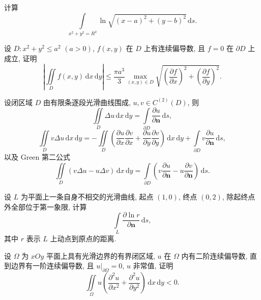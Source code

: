 \documentclass[../数学分析培优讲义.tex]{subfiles}
\begin{document}
\begin{example}
计算
\[
    \int\limits_{x^2+y^2=R^2}\ln\sqrt{(x-a)^2+(y-b)^2}\,\mathrm{d}s.
\]
\end{example}
\exampleblank

\begin{example}
设 $D:x^2+y^2\leq a^2$ $(a>0)$, $f(x,y)$ 在 $D$ 上有连续偏导数, 且 $f=0$ 在 $\partial D$ 上成立, 证明
\[
    \left|\iint\limits_Df(x,y)\,\mathrm{d}x\,\mathrm{d}y\right|
    \leq\dfrac{\pi a^3}{3}\max_{(x,y)\in D}
    \sqrt{\left(\dfrac{\partial f}{\partial x}\right)^2+
    \left(\dfrac{\partial f}{\partial y}\right)^2}.
\]
\end{example}
\exampleblank


\newpage


\begin{theorem}[\markstar]
设闭区域 $D$ 由有限条逐段光滑曲线围成, $u,v\in C^{(2)}(D)$, 则
\[
    \iint\limits_D\Delta u\,\mathrm{d}x\,\mathrm{d}y
    =\int\limits_{\partial D}\dfrac{\partial u}{\partial\bm n}\,\mathrm{d}s,
\]
\[
    \iint\limits_Dv\Delta u\,\mathrm{d}x\,\mathrm{d}y
    =-\iint\limits_D\left(
    \dfrac{\partial u}{\partial x}\dfrac{\partial v}{\partial x}
    +\dfrac{\partial u}{\partial y}\dfrac{\partial v}{\partial y}
    \right)\,\mathrm{d}x\,\mathrm{d}y
    +\int\limits_{\partial D}v\dfrac{\partial u}{\partial\bm n}\,\mathrm{d}s,
\]
以及 Green 第二公式
\[
    \iint\limits_D(v\Delta u-u\Delta v)\,\mathrm{d}x\,\mathrm{d}y
    =\int\limits_{\partial D}\left(v\dfrac{\partial u}{\partial\bm n}-u\dfrac{\partial v}{\partial\bm n}\right)\,\mathrm{d}s.
\]
\end{theorem}

\begin{example}
设 $L$ 为平面上一条自身不相交的光滑曲线, 起点 $(1,0)$, 终点 $(0,2)$, 除起终点外全部位于第一象限, 计算
\[
    \int\limits_L\dfrac{\partial\ln r}{\partial\bm n}\,\mathrm{d}s,
\]
其中 $r$ 表示 $L$ 上动点到原点的距离.
\end{example}
\exampleblank

\begin{example}
设 $\Omega$ 为 $xOy$ 平面上具有光滑边界的有界闭区域, $u$ 在 $\Omega$ 内有二阶连续偏导数, 直到边界有一阶连续偏导数, 且 $u|_{\partial\Omega}=0$, $u$ 非常值, 证明
\[
    \iint\limits_\Omega u\left(\dfrac{\partial^2u}{\partial x^2}+\dfrac{\partial^2u}{\partial y^2}\right)\,\mathrm{d}x\,\mathrm{d}y<0.
\]
\end{example}
\exampleblank
\end{document}

